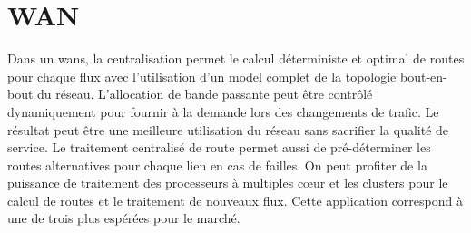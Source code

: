

\section{WAN}
Dans un \glspl{wan}, la centralisation permet le calcul déterministe et optimal de routes pour chaque flux avec l'utilisation d'un model complet de la topologie bout-en-bout du réseau. L'allocation de bande passante peut être contrôlé dynamiquement pour fournir à la demande lors des changements de trafic. Le résultat peut être une meilleure utilisation du réseau sans sacrifier la qualité de service. Le traitement centralisé de route permet aussi de pré-déterminer les routes alternatives pour chaque lien en cas de failles. On peut profiter de la puissance de traitement des processeurs à multiples cœur et les \glspl{cluster} pour le calcul de routes et le traitement de nouveaux flux. Cette application correspond à une de trois plus espérées pour le marché. \cite{2013GuideSDNNVUseCases}





